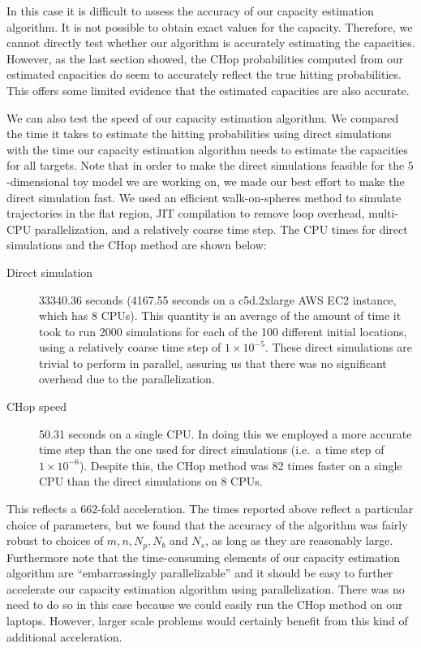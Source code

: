 \documentclass[english, aip, jcp, priprint, graphicx,floatfix]{revtex4-1}
\theoremstyle{plain}
\theoremstyle{definition}
\theoremstyle{plain}
\begin{document}
In this case it is difficult to assess the accuracy of our capacity estimation algorithm.  It is not possible to obtain exact values for the capacity.  Therefore, we cannot directly test whether our algorithm is accurately estimating the capacities.  However, as the last section showed, the CHop probabilities computed from our estimated capacities do seem to accurately reflect the true hitting probabilities.  This offers some limited evidence that the estimated capacities are also accurate.

We can also test the speed of our capacity estimation algorithm.  We compared the time it takes to estimate the hitting probabilities using direct simulations with the time our capacity estimation algorithm needs to estimate the capacities for all targets. Note that in order to make the direct simulations feasible for the $5$-dimensional toy model we are working on, we made our best effort to make the direct simulation fast.  We used an efficient walk-on-spheres method to simulate trajectories in the flat region,\cite{bingham1972random} JIT compilation to remove loop overhead, multi-CPU parallelization, and a relatively coarse time step.  The CPU times for direct simulations and the CHop method are shown below:

\begin{description}
\item[Direct simulation] 33340.36 seconds (4167.55 seconds on a c5d.2xlarge AWS EC2 instance, which has 8 CPUs).  This quantity is an average of the amount of time it took to run 2000 simulations for each of the 100 different initial locations, using a relatively coarse time step of $1 \times 10^{-5}$.  These direct simulations are trivial to perform in parallel, assuring us that there was no significant overhead due to the parallelization.

\item[CHop speed] 50.31 seconds on a single CPU. In doing this we employed a more accurate time step than the one used for direct simulations (i.e.\ a time step of $1 \times 10^{-6}$). Despite this, the CHop method was 82 times faster on a single CPU than the direct simulations on 8 CPUs.

\end{description}

This reflects a 662-fold acceleration. The times reported above reflect a particular choice of parameters, but we found that the accuracy of the algorithm was fairly robust to choices of $m, n, N_p, N_b$ and $N_s$, as long as they are reasonably large. Furthermore note that the time-consuming elements of our capacity estimation algorithm are ``embarrassingly parallelizable'' and it should be easy to further accelerate our capacity estimation algorithm using parallelization.  There was no need to do so in this case because we could easily run the CHop method on our laptops.  However, larger scale problems would certainly benefit from this kind of additional acceleration.
\end{document}
